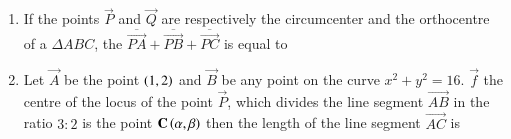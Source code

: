 \documentclass[journal]{IEEEtran}
\numberwithin{equation}{enumi}
\numberwithin{figure}{enumi}
\begin{document}
\begin{enumerate}
    \item
    If the points $\vec{P}$ and $\vec{Q}$ are respectively the circumcenter and the orthocentre of a $\Delta ABC$, the $\overline{\vec{PA}} + \overline{\vec{PB}} + \overline{\vec{PC}}$ is equal to

    \hfill{}

    \begin{enumerate}
    \end{enumerate}

    \begin{figure}[H]
        \centering
    \end{figure}

    \item 
    Let $\vec{A}$ be the point $\left(1, 2\right)$ and $\vec{B}$ be any point on the curve $x^2 + y^2 = 16$. $\vec{f}$ the centre of the locus of the point $\vec{P}$, which divides the line segment $\vec{AB}$ in the ratio $3 : 2$ is the point $\mathbf{C}\left(\alpha, \beta\right)$ then the length of the line segment $\vec{AC}$ is

    \hfill{}

    \begin{enumerate}
    \end{enumerate}


\end{enumerate}
\end{document}
